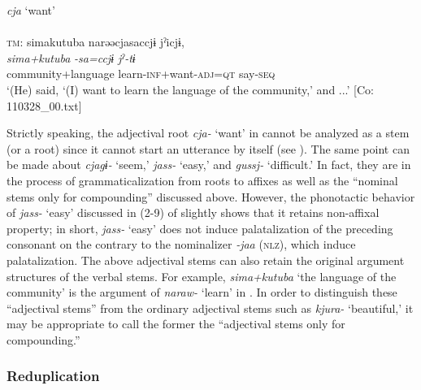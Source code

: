 \ea  \textit{cja} ‘want’ \label{ex:4.36}\\\\
\glll  \textsc{tm}:  simakutuba   narəəcjasaccjɨ  jˀicjɨ,\\
    \textit{sima+kutuba}  \textit{-sa=ccjɨ  jˀ-tɨ}\\
    community+language  learn-\textsc{inf}+want-\textsc{adj}=\textsc{qt}  say-\textsc{seq}\\
    \glt     ‘(He) said, ‘(I) want to learn the language of the community,’ and ...’ [Co: 110328\_00.txt]
\z

Strictly speaking, the adjectival root \textit{cja-} ‘want’ in  cannot be analyzed as a stem (or a root) since it cannot start an utterance by itself (see ). The same point can be made about \textit{cjagɨ-} ‘seem,’ \textit{jass-} ‘easy,’ and \textit{gussj-} ‘difficult.’ In fact, they are in the process of grammaticalization from roots to affixes as well as the “nominal stems only for compounding” discussed above. However, the phonotactic behavior of \textit{jass-} ‘easy’ discussed in (2-9) of  slightly shows that it retains non-affixal property; in short, \textit{jass-} ‘easy’ does not induce palatalization of the preceding consonant on the contrary to the nominalizer \textit{{}-jaa} (\textsc{nlz}), which induce palatalization. The above adjectival stems can also retain the original argument structures of the verbal stems. For example, \textit{sima+kutuba} ‘the language of the community’ is the argument of \textit{naraw-} ‘learn’ in . In order to distinguish these “adjectival stems” from the ordinary adjectival stems such as \textit{kjura-} ‘beautiful,’ it may be appropriate to call the former the “adjectival stems only for compounding.”

\subsubsection{Reduplication}\label{sec:4.2.3.3}

